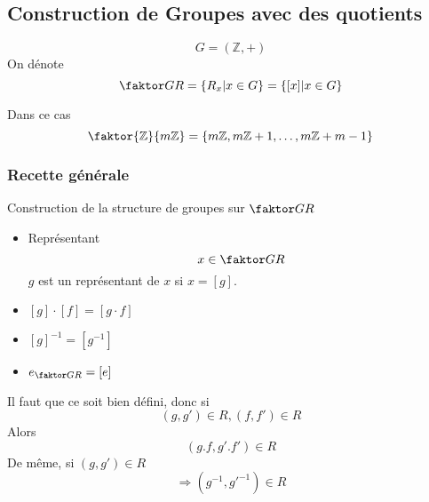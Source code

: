\documentclass[../main.tex]{subfiles}
\begin{document}
\subsection{Construction de Groupes avec des quotients}
\begin{exemple}
\[ 
	G = ( \mathbb{Z},+)
\]
On dénote
\[ 
\faktor G R = \left\{ R_x | x\in G \right\} = \left\{ [ x] | x \in G \right\} 
\]

Dans ce cas
\[ 
\faktor {\mathbb{Z} } { m\mathbb{Z}} = \left\{ m \mathbb{Z}, m\mathbb{Z}+1, \ldots , m\mathbb{Z}+ m-1 \right\} 
\]
\end{exemple}
\subsubsection{Recette générale}
Construction de la structure de groupes sur $ \faktor G R$ 
\begin{itemize}
\item Représentant\\
	\[ 
	x \in \faktor G R
	\]
	$g$ est un représentant de $x$ si $x= [ g]$.
\item $ [ g] \cdot [ f] = [ g \cdot f]$
\item $[g]^{-1} = [ g^{-1}]$
\item $e_{\faktor G R} = [ e]$
\end{itemize}
Il faut que ce soit bien défini, donc si
\[ 
	( g,g') \in R, ( f,f') \in R
\]
Alors
\[ 
	( g.f, g'.f') \in R
\]
De même, si $ ( g, g') \in R$ 
\[ 
	\Rightarrow ( g^{-1}, g'^{-1}) \in R
\]
\end{document}
